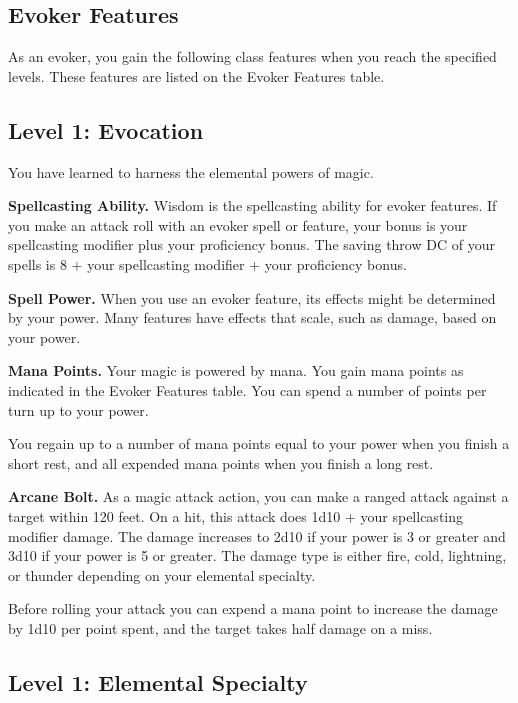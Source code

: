 \documentclass[12pt,letterpaper,twocolumn,openany,nodeprecatedcode,bg=none]{dndbook}
\begin{document}
\subsection{Evoker Features}\label{evoker-features-1}

As an evoker, you gain the following class features when you reach the
specified levels. These features are listed on the Evoker Features
table.

\subsection{Level 1: Evocation}\label{level-1-evocation}

You have learned to harness the elemental powers of magic.

\textbf{Spellcasting Ability.} Wisdom is the spellcasting ability for
evoker features. If you make an attack roll with an evoker spell or
feature, your bonus is your spellcasting modifier plus your proficiency
bonus. The saving throw DC of your spells is 8 + your spellcasting
modifier + your proficiency bonus.

\textbf{Spell Power.} When you use an evoker feature, its effects might
be determined by your power. Many features have effects that scale, such
as damage, based on your power.

\textbf{Mana Points.} Your magic is powered by mana. You gain mana
points as indicated in the Evoker Features table. You can spend a number
of points per turn up to your power.

You regain up to a number of mana points equal to your power when you
finish a short rest, and all expended mana points when you finish a long
rest.

\textbf{Arcane Bolt.} As a magic attack action, you can make a ranged
attack against a target within 120 feet. On a hit, this attack does 1d10
+ your spellcasting modifier damage. The damage increases to 2d10 if
your power is 3 or greater and 3d10 if your power is 5 or greater. The
damage type is either fire, cold, lightning, or thunder depending on
your elemental specialty.

Before rolling your attack you can expend a mana point to increase the
damage by 1d10 per point spent, and the target takes half damage on a
miss.

\subsection{Level 1: Elemental
Specialty}\label{level-1-elemental-specialty}
\end{document}
